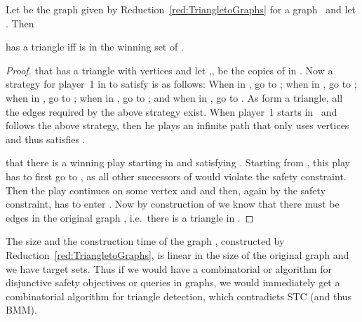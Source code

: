 \documentclass[11pt,letterpaper]{article}
\newif\iffullversion
\newcommand{\infull}[1]{\iffullversion #1\fi}
\newcommand{\inshort}[1]{\iffullversion \else #1\fi}
\begin{document}
\begin{lemma}
 Let  be the graph given by Reduction~\ref{red:TriangletoGraphs} for a graph~
 and  
 let . Then 
    \infull{the following statements are equivalent.
  \begin{enumerate}
  \item
   has a triangle.
  \item  is in the winning set of  .
  \item The winning set of  is non-empty.
  \end{enumerate}
  }
  \inshort{ has a triangle iff  is in the winning set of  .}
\end{lemma}
\begin{proof}
 \infull{(1)(2): Assume} that
  has a triangle with vertices  and 
 let ,, be the copies of  in .
 Now a strategy for player~1 in  to satisfy  is as follows:
 When in , go to ; when in , go to ; when in , go to ;
 when in , go to ; and when in , go to .
 As  form a triangle, all the edges required by the above strategy exist.
 When player~1 starts in~ and follows the above strategy,
 then he plays an infinite path
 that only uses vertices  and thus satisfies .

 \infull{(2)(1): Assume} that there is a
 winning play starting in  and satisfying .
 Starting from , this play has to first go to , as all other successors of  would violate
 the safety constraint. Then the play continues on some vertex  and 
 and then, again by the safety constraint, has to enter .
 Now by construction of  we know that there must be edges  in the original graph ,
 i.e.\ there is a triangle in .  \infull{
 
 (2)(3): Notice that when removing  from  we get an acyclic graph and thus each infinite
 path has to contain  infinitely often. Thus, if the winning set is non-empty,
 there is a cycle winning for some vertex and then 
 this cycle is also winning for . For the converse direction we have that if  is in the winning set, then the winning set is non-empty.}
\end{proof}

The size and the construction time of the graph , constructed 
by Reduction~\ref{red:TriangletoGraphs}, is linear in the size of the 
original graph  and we have  target sets.
Thus if we would have a combinatorial   or  algorithm for disjunctive 
safety objectives or queries in graphs, we
would immediately get a combinatorial   algorithm for triangle detection, which contradicts STC (and thus BMM).
\end{document}
